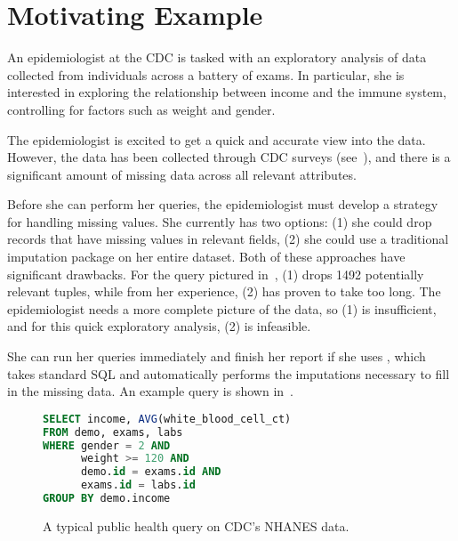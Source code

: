 \section{Motivating Example}
An epidemiologist at the CDC is tasked with an 
exploratory analysis of data collected from individuals across
a battery of exams. In particular, she is interested in exploring
the relationship between income and the immune system,
controlling for factors such as weight and gender.

The epidemiologist is excited
to get a quick and accurate view into the data. However,
the data has been collected through CDC surveys (see~),
and there is a significant amount of missing data across all
relevant attributes. 

Before she can perform her queries, the epidemiologist must develop a strategy
for handling missing values. She currently has two options:
(1) she could drop records that have missing values in relevant fields,
(2) she could use a traditional imputation package on her entire dataset. Both of these
approaches have significant drawbacks. For the query pictured in~, 
(1) drops 1492 potentially relevant tuples,
while from her experience, (2) has proven to take too long. The epidemiologist needs a more complete picture
of the data, so (1) is insufficient, and for this quick exploratory analysis, (2)
is infeasible.

She can run her queries immediately and finish her report if
she uses \ProjectName{}, which takes standard SQL and automatically performs the imputations
necessary to fill in the missing data.
An example query is shown in~.

\begin{figure}
\begin{lstlisting}[language=SQL]
SELECT income, AVG(white_blood_cell_ct)
FROM demo, exams, labs
WHERE gender = 2 AND 
      weight >= 120 AND
      demo.id = exams.id AND 
      exams.id = labs.id
GROUP BY demo.income
\end{lstlisting}
\caption{A typical public health query on CDC's NHANES data.}
\label{fig:example-query}
\end{figure}

